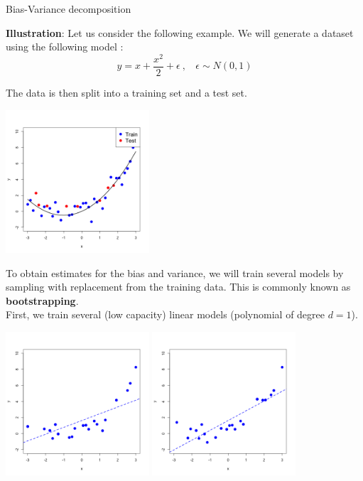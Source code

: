 \documentclass[11pt,compress,t,notes=noshow, xcolor=table]{beamer}
\begin{document}
\begin{vbframe} {Bias-Variance decomposition}



\framebreak

\textbf{Illustration}: Let us consider the following example. We will generate a dataset using the following model : 
$$y = x + \frac{x^2}{2} + \epsilon  \ , \ \ \ \ \epsilon \sim 
N (0, 1)$$

The data is then split into a training set and a test set.

\begin{center}
  \includegraphics[width = 0.4\textwidth]{figure/bias_variance_decomposition-train_test.png}
\end{center}

\framebreak

To obtain estimates for the bias and variance, we will train several models by sampling with replacement from the training data. This is commonly known as \textbf{bootstrapping}. \\
\vspace{0.3cm}
First, we train several (low capacity) linear models (polynomial of degree $d=1$).

\begin{center}
  \includegraphics[width = 0.4\textwidth]{figure/bias_variance_decomposition-bootstrap_1.png}
  \includegraphics[width = 0.4\textwidth]{figure/bias_variance_decomposition-bootstrap_2.png}
\end{center}


\end{vbframe}
\end{document}
